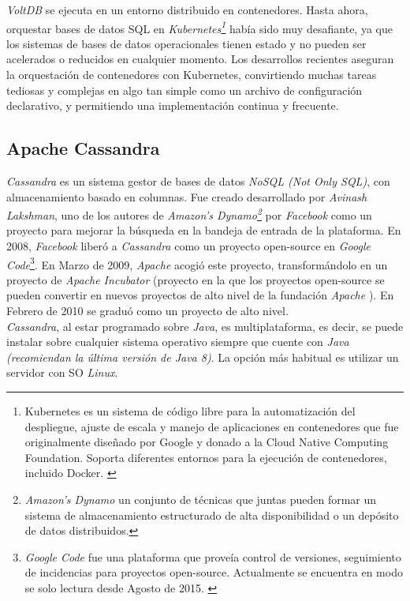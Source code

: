 \documentclass{article}
\begin{document}
\emph{VoltDB} se ejecuta en un entorno distribuido en contenedores. Hasta ahora, orquestar bases de datos SQL en \emph{Kubernetes\footnote{Kubernetes es un sistema de código libre para la automatización del despliegue, ajuste de escala y manejo de aplicaciones en contenedores que fue originalmente diseñado por Google y donado a la Cloud Native Computing Foundation. Soporta diferentes entornos para la ejecución de contenedores, incluido Docker. \cite{VOLT:7}}} había sido muy desafiante, ya que los sistemas de bases de datos operacionales tienen estado y no pueden ser acelerados o reducidos en cualquier momento. Los desarrollos recientes aseguran la orquestación de contenedores con Kubernetes, convirtiendo muchas tareas tediosas y complejas en algo tan simple como un archivo de configuración declarativo, y permitiendo una implementación continua y frecuente. \cite{VOLT:6}\\

\subsection{Apache Cassandra}

\emph{Cassandra} es un sistema gestor de bases de datos \emph{NoSQL (Not Only SQL)}, con almacenamiento basado en columnas. Fue creado desarrollado por \emph{Avinash Lakshman}, uno de los autores de \emph{Amazon's Dynamo\footnote{\emph{Amazon's Dynamo} un conjunto de técnicas que juntas pueden formar un sistema de almacenamiento estructurado de alta disponibilidad o un depósito de datos distribuidos.\cite{WIKI:3}}} por \emph{Facebook} como un proyecto para mejorar la búsqueda en la bandeja de entrada de la plataforma. En 2008, \emph{Facebook} liberó a \emph{Cassandra} como un proyecto open-source en \emph{Google Code}\footnote{\emph{Google Code} fue una plataforma que proveía control de versiones, seguimiento de incidencias para proyectos open-source. Actualmente se encuentra en modo se solo lectura desde Agosto de 2015. \cite{WIKI:4}}. En Marzo de 2009, \emph{Apache} acogió este proyecto, transformándolo en un proyecto de \emph{Apache Incubator} (proyecto en la que los proyectos open-source se pueden convertir en nuevos proyectos de alto nivel de la fundación \emph{Apache} \cite{AP:1}). En Febrero de 2010 se graduó como un proyecto de alto nivel. \cite{WIKI:5}\\

\emph{Cassandra}, al estar programado sobre \emph{Java}, es multiplataforma, es decir, se puede instalar sobre cualquier sistema operativo siempre que cuente con \emph{Java (recomiendan la última versión de Java 8)}. La opción más habitual es utilizar un servidor con SO \emph{Linux}. \cite{AP:2}\\
\end{document}
